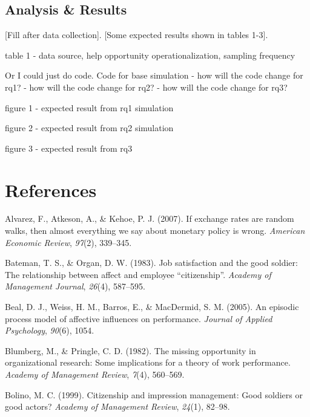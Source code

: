 \documentclass[english,,man]{apa6}
\theoremstyle{definition}
\theoremstyle{definition}
\theoremstyle{definition}
\theoremstyle{remark}
\begin{document}
\hypertarget{analysis-results}{%
\subsection{Analysis \& Results}\label{analysis-results}}

{[}Fill after data collection{]}. {[}Some expected results shown in
tables 1-3{]}.

table 1 - data source, help opportunity operationalization, sampling
frequency

Or I could just do code. Code for base simulation - how will the code
change for rq1? - how will the code change for rq2? - how will the code
change for rq3?

figure 1 - expected result from rq1 simulation

figure 2 - expected result from rq2 simulation

figure 3 - expected result from rq3

\newpage

\hypertarget{references}{%
\section{References}\label{references}}

\setlength{\parindent}{-0.5in}
\setlength{\leftskip}{0.5in}

\hypertarget{refs}{}
\leavevmode\hypertarget{ref-alvarez2007if}{}%
Alvarez, F., Atkeson, A., \& Kehoe, P. J. (2007). If exchange rates are
random walks, then almost everything we say about monetary policy is
wrong. \emph{American Economic Review}, \emph{97}(2), 339--345.

\leavevmode\hypertarget{ref-bateman_job_1983}{}%
Bateman, T. S., \& Organ, D. W. (1983). Job satisfaction and the good
soldier: The relationship between affect and employee ``citizenship''.
\emph{Academy of Management Journal}, \emph{26}(4), 587--595.

\leavevmode\hypertarget{ref-beal_episodic_2005}{}%
Beal, D. J., Weiss, H. M., Barros, E., \& MacDermid, S. M. (2005). An
episodic process model of affective influences on performance.
\emph{Journal of Applied Psychology}, \emph{90}(6), 1054.

\leavevmode\hypertarget{ref-blumberg1982missing}{}%
Blumberg, M., \& Pringle, C. D. (1982). The missing opportunity in
organizational research: Some implications for a theory of work
performance. \emph{Academy of Management Review}, \emph{7}(4), 560--569.

\leavevmode\hypertarget{ref-bolino_citizenship_1999}{}%
Bolino, M. C. (1999). Citizenship and impression management: Good
soldiers or good actors? \emph{Academy of Management Review},
\emph{24}(1), 82--98.
\end{document}
